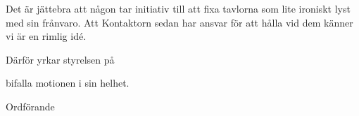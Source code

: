 \documentclass[../_main/handlingar.tex]{subfiles}
\begin{document}
\motionssvar

Det är jättebra att någon tar initiativ till att fixa tavlorna som lite ironiskt lyst med sin frånvaro. Att Kontaktorn sedan har ansvar för att hålla vid dem känner vi är en rimlig idé.

Därför yrkar styrelsen på
\begin{attsatser}
    \att bifalla motionen i sin helhet.
\end{attsatser}

\begin{signatures}{1}
    \ist
    \signature{Erik Månsson}{Ordförande}
\end{signatures}
\end{document}
